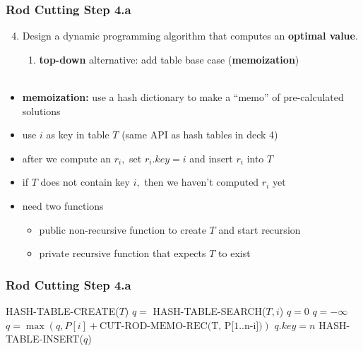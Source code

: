 \documentclass{beamer}
\newcommand{\stanza}{ \\~\ }
\begin{document}
\begin{frame} \frametitle{Rod Cutting Step 4.a}
  \begin{enumerate}
    \setcounter{enumi}{3}
    \item Design a dynamic programming algorithm that computes an \textbf{optimal value}.
    \begin{enumerate}
      \item \textbf{top-down} alternative: add table base case (\textbf{memoization})
      \stanza
    \end{enumerate}
\end{enumerate}

\begin{itemize}
  \item \textbf{memoization:} use a hash dictionary to make a ``memo'' of pre-calculated solutions
  \item use $i$ as key in table $T$ (same API as hash tables in deck 4)
  \item after we compute an $r_i,$ set $r_i.key = i$ and insert $r_i$ into $T$
  \item if $T$ does not contain key $i,$ then we haven't computed $r_i$ yet
  \item need two functions
  \begin{itemize}
    \item public non-recursive function to create $T$ and start recursion
    \item private recursive function that expects $T$ to exist
  \end{itemize}
\end{itemize}
\end{frame}

\begin{frame} \frametitle{Rod Cutting Step 4.a}
  {\scriptsize
  \begin{algorithmic}[1]
    \State HASH-TABLE-CREATE($T$)
    \State {}
    \EndFunction
    \State $q = $ HASH-TABLE-SEARCH($T, i$)
      \State {}
    \EndIf
      \State $q=0$
    \Else
      \State $q=-\infty$
        \State $q = \max(q, P[i] + \text{CUT-ROD-MEMO-REC(T, P[1..n-i])})$
      \EndFor
    \EndIf
    \State $q.key = n$
    \State HASH-TABLE-INSERT($q$)
    \State {}
    \EndFunction
  \end{algorithmic}
  }
\end{frame}
\end{document}
